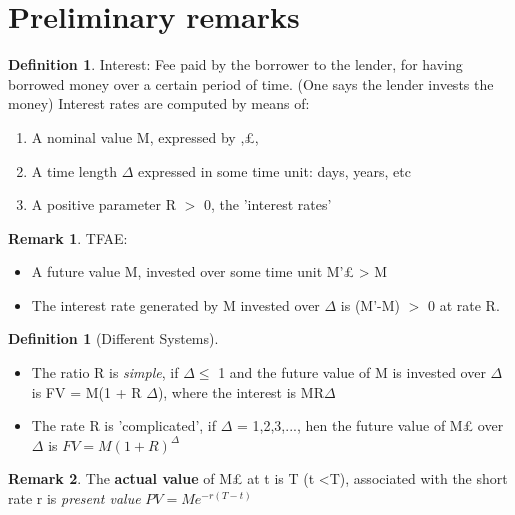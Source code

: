 \documentclass[10pt, oneside, reqno]{amsbook}
\theoremstyle{plain}%
\theoremstyle{definition}
\theoremstyle{rem}
\newtheorem*{rem}{Remark}
\theoremstyle{definition}
\newtheorem{dfn}[thm]{Definition}
\newcommand{\gt}{>}
\newcommand{\lt}{<}
\numberwithin{equation}{chapter}
\begin{document}
\section{Preliminary remarks} 
\begin{dfn}
 Interest: Fee paid by the borrower to the lender, for having borrowed money over a certain period of time.
(One says the lender invests the money)
Interest rates are computed by means of:
\begin{enumerate}
 \item A nominal value M, expressed by \textlira,\pounds \;, \textdollar
\item A time length $\Delta$ expressed in some time unit: days, years, etc
\item A positive parameter R $\gt$ 0, the 'interest rates' 
\end{enumerate}

\end{dfn}
\begin{rem}
 TFAE: 

\begin{itemize}
 \item A future value M, invested over some time unit M'\pounds \; > M 
\item The interest rate generated by M invested over $\Delta$ is (M'-M) $\gt$ 0 at rate R.
\end{itemize}

\end{rem}
\begin{dfn}[Different Systems]
\begin{itemize}
 \item The ratio R is \textit{simple}, if $\Delta \leq$ 1 and the future value of M is invested over $\Delta$ is 
FV = M(1 + R $\Delta$), where the interest is MR$\Delta$
\item The rate R is 'complicated', if $\Delta$ = 1,2,3,..., hen the future value of M\pounds \;
 over $\Delta$ is 
$FV = M(1 + R)^{\Delta}$ 
\end{itemize}

\end{dfn}
\begin{rem}
 The \textbf{actual value} of M\pounds \; at t is T (t \lt T), associated with the short rate r is \textit{present value}
$PV = Me^{-r(T-t)}$ 
\end{rem}
\end{document}

